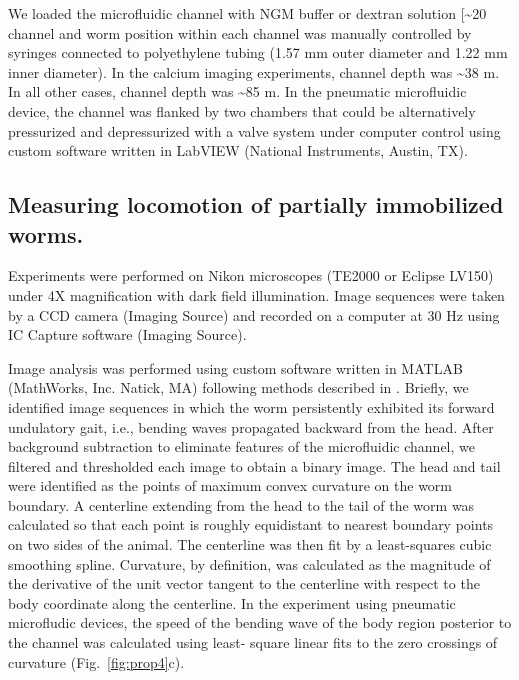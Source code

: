 We loaded the microfluidic channel with NGM buffer or dextran solution [\textasciitilde 20\\%
channel and worm position within each channel was manually controlled by syringes connected 
to polyethylene tubing (1.57 mm outer diameter and 1.22 mm inner diameter). In the calcium 
imaging experiments, channel depth was \textasciitilde 38 \textmu m. In all other cases, channel depth was \textasciitilde 85 \textmu m. 
In the pneumatic microfluidic device, the channel was flanked by two chambers that could be 
alternatively pressurized and depressurized with a valve system under computer control using 
custom software written in LabVIEW (National Instruments, Austin, TX). 


\subsection{Measuring locomotion of partially immobilized worms.}

Experiments were performed on 
Nikon microscopes (TE2000 or Eclipse LV150) under 4X magnification with dark field 
illumination. Image sequences were taken by a CCD camera (Imaging Source) and recorded on a 
computer at 30 Hz using IC Capture software (Imaging Source).  
 
Image analysis was performed using custom  software written in MATLAB (MathWorks, Inc. 
Natick, MA) following methods described in \citep{fang-yen_biomechanical_2010}. Briefly, we identified image sequences in 
which the worm persistently exhibited its forward undulatory gait, i.e., bending waves 
propagated backward from the head. After background subtraction to eliminate features of the 
microfluidic channel, we filtered and thresholded each image to obtain a binary image. The head 
and tail were identified as the points of maximum convex curvature on the worm boundary. A 
centerline extending from the head to the tail of the worm was calculated so that each point is 
roughly equidistant to nearest boundary points on two sides of the animal. The centerline was 
then fit by a least-squares cubic smoothing spline. Curvature, by definition, was calculated as the 
magnitude of the derivative of the unit vector tangent to the centerline with respect to the body 
coordinate along the centerline. In the experiment using pneumatic microfludic devices, the 
speed of the bending wave of the body region posterior to the channel was calculated using least- 
square linear fits to the zero crossings of curvature (Fig.~\ref{fig:prop4}c). 



